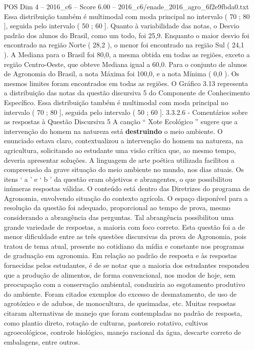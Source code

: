 \begin{textsample}{POS Dim 4 – 2016\_c6 – Score 6.00 – 2016\_c6/enade\_2016\_agro\_6f2e9fbda0.txt}
Essa distribuição também é multimodal com moda principal no intervalo ( 70 ; 80 ], seguida pelo intervalo ( 50 ; 60 ].
Quanto à variabilidade das notas, o Desvio padrão dos alunos do Brasil, como um todo, foi 25,9.
Enquanto o maior desvio foi encontrado na região Norte ( 28,2 ), o menor foi encontrado na região Sul ( 24,1 ).
A Mediana para o Brasil foi 80,0, a mesma obtida em todas as regiões, exceto a região Centro-Oeste, que obteve Mediana igual a 60,0.
Para o conjunto de alunos de Agronomia do Brasil, a nota Máxima foi 100,0, e a nota Mínima ( 0,0 ).
Os mesmos limites foram encontrados em todas as regiões.
O Gráfico 3.13 representa a distribuição das notas da questão discursiva 5 do Componente de Conhecimento Específico.
Essa distribuição também é multimodal com moda principal no intervalo ( 70 ; 80 ], seguida pelo intervalo ( 50 ; 60 ]. 3.3.2.6 - Comentários sobre as respostas à Questão Discursiva 5 A canção “ Xote Ecológico ” sugere que a intervenção do homem na natureza está \textbf{destruindo} o meio ambiente.
O enunciado estava claro, contextualizou a intervenção do homem na natureza, na agricultura, solicitando ao estudante uma visão crítica que, ao mesmo tempo, deveria apresentar soluções.
A linguagem de arte poética utilizada facilitou a compreensão da grave situação do meio ambiente no mundo, nos dias atuais.
Os itens ‘ a ’ e ‘ b ’ da questão eram objetivos e abrangentes, o que possibilitou inúmeras respostas válidas.
O conteúdo está dentro das Diretrizes do programa de Agronomia, envolvendo situação do contexto agrícola.
O espaço disponível para a resolução da questão foi adequado, proporcional ao tempo de prova, mesmo considerando a abrangência das perguntas.
Tal abrangência possibilitou uma grande variedade de respostas, a maioria com foco correto.
Esta questão foi a de menor dificuldade entre as três questões discursivas da prova de Agronomia, pois tratou de tema atual, presente no cotidiano da mídia e constante nos programas de graduação em agronomia.
Em relação ao padrão de resposta e às respostas fornecidas pelos estudantes, é de se notar que a maioria dos estudantes respondeu que a produção de alimentos, de forma convencional, nos modos de hoje, sem preocupação com a conservação ambiental, conduziria ao esgotamento produtivo do ambiente.
Foram citados exemplos do excesso de desmatamento, de uso de agrotóxico e de adubos, de monocultura, de queimadas, etc.
Muitas respostas citaram alternativas de manejo que foram contempladas no padrão de resposta, como plantio direto, rotação de culturas, pastoreio rotativo, cultivos agroecológicos, controle biológico, manejo racional da água, descarte correto de embalagens, entre outros.

\end{textsample}
